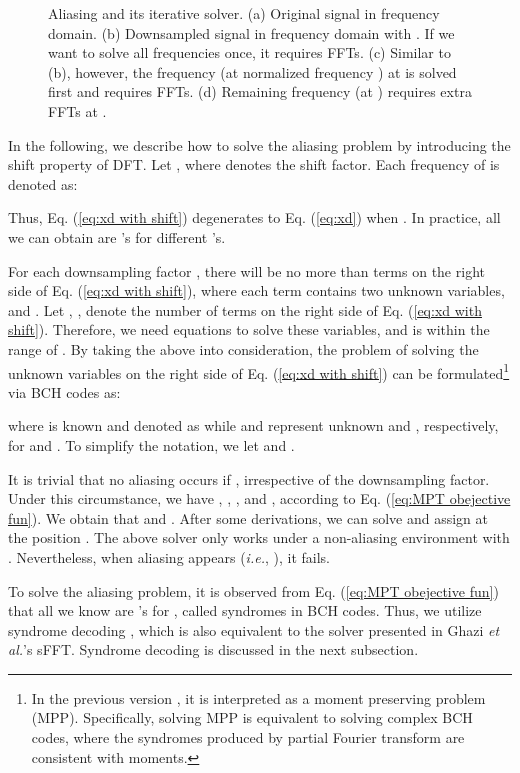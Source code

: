 \documentclass[journal,onecolumn,11pt]{IEEEtran}
\begin{document}
\begin{figure}[h]
\hfill
\caption{Aliasing and its iterative solver. (a) Original signal in frequency domain. (b) Downsampled signal in frequency domain with . If we want to solve all frequencies once, it requires  FFTs. (c) Similar to (b), however, the frequency (at normalized frequency ) at  is solved first and requires  FFTs. (d) Remaining frequency (at ) requires  extra FFTs at .}
\label{fig:Iterative Pyramid}
\end{figure}

In the following, we describe how to solve the aliasing problem by introducing the shift property of DFT.
Let , where  denotes the shift factor.
Each frequency of  is denoted as:
\small

\normalsize
Thus, Eq. (\ref{eq:xd with shift}) degenerates to Eq. (\ref{eq:xd}) when . In practice, all we can obtain are 's for different 's.

For each downsampling factor , there will be no more than  terms on the right side of Eq. (\ref{eq:xd with shift}), where
each term contains two unknown variables,  and .
Let , , denote the number of terms on the right side of Eq. (\ref{eq:xd with shift}).
Therefore, we need  equations to solve these  variables, and  is within the range of .
By taking the above into consideration, the problem of solving the  unknown variables on the right side of Eq. (\ref{eq:xd with shift}) can be formulated\footnote{In the previous version \cite{Hsieh2013}, it is interpreted as a moment preserving problem (MPP). Specifically, solving MPP is equivalent to solving complex BCH codes, where the syndromes produced by partial Fourier transform are consistent with moments.} via BCH codes as:
\small

\normalsize
where  is known and denoted as   while  and  represent unknown  and , respectively, for  and . To simplify the notation, we let  and .

It is trivial that no aliasing occurs if , irrespective of the downsampling factor.
Under this circumstance, we have , , , and , according to Eq. (\ref{eq:MPT obejective fun}).
We obtain that  and .
After some derivations, we can solve  and assign  at the position .
The above solver only works under a non-aliasing environment with .
Nevertheless, when aliasing appears ({\em i.e.}, ), it fails.

To solve the aliasing problem, it is observed from Eq. (\ref{eq:MPT obejective fun}) that all we know are 's for , called syndromes in BCH codes.
Thus, we utilize syndrome decoding \cite{MacWilliams11977}, which is also equivalent to the solver presented in Ghazi {\em et al.}'s sFFT.
Syndrome decoding is discussed in the next subsection.
\end{document}
